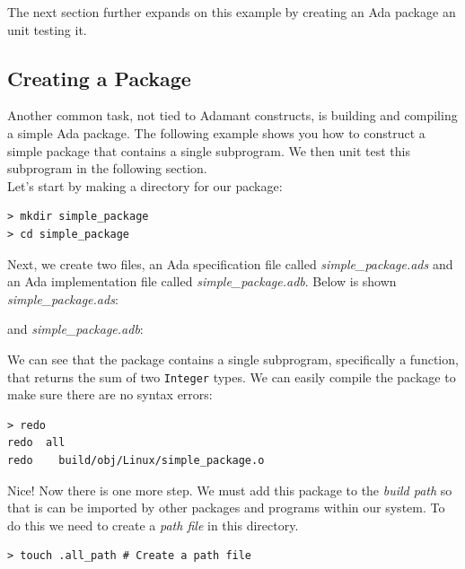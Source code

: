 The next section further expands on this example by creating an Ada package an unit testing it.

\subsection{Creating a Package}

Another common task, not tied to Adamant constructs, is building and compiling a simple Ada package. The following example shows you how to construct a simple package that contains a single subprogram. We then unit test this subprogram in the following section. \\

Let's start by making a directory for our package:

\vspace{5mm} %
\begin{verbatim}
> mkdir simple_package 
> cd simple_package 
\end{verbatim}
\vspace{5mm} %

Next, we create two files, an Ada specification file called \textit{simple\_package.ads} and an Ada implementation file called \textit{simple\_package.adb}. Below is shown \textit{simple\_package.ads}:


and \textit{simple\_package.adb}:


We can see that the package contains a single subprogram, specifically a function, that returns the sum of two \texttt{Integer} types. We can easily compile the package to make sure there are no syntax errors:

\vspace{5mm} %
\begin{verbatim}
> redo
redo  all
redo    build/obj/Linux/simple_package.o
\end{verbatim}
\vspace{5mm} %

Nice! Now there is one more step. We must add this package to the \textit{build path} so that is can be imported by other packages and programs within our system. To do this we need to create a \textit{path file} in this directory.

\vspace{5mm} %
\begin{verbatim}
> touch .all_path # Create a path file
\end{verbatim}
\vspace{5mm} %

